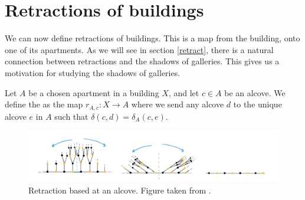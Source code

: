\documentclass[11pt]{article}
\begin{document}




\section{Retractions of buildings}\label{5}


We can now define retractions of buildings. This is a map from the building, onto one of its apartments. As we will see in section \ref{retract}, there is a natural connection between retractions and the shadows of galleries. This gives us a motivation for studying the shadows of galleries. 

\begin{definition}
    Let $A$ be a chosen apartment in a building $X$, and let $c\in A$ be an alcove. We define the  as the map $r_{A,c}:X\longrightarrow A$ where we send any alcove $d$ to the unique alcove $e$ in $A$ such that $\delta(c,d)=\delta_A(c,e)$. 
\end{definition}
\begin{figure}[!htbp] 
    \begin{center}  
    \includegraphics[scale=0.6]{Screenshot 2023-04-18 at 14.50.22.png}
    \end{center}
    \caption{Retraction based at an alcove. Figure taken from \cite[p.25]{WILD}.}
\end{figure}
\end{document}
